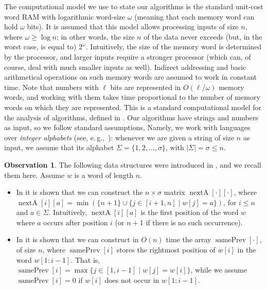 \documentclass[10pt,a4paper]{amsart}
\DeclareMathOperator{\prevArray}{samePrev}
\DeclareMathOperator{\nextpos}{nextA}
\theoremstyle{plain}
\theoremstyle{definition}
\newtheorem{observation}{Observation}
\begin{document}
The computational model we use to state our algorithms is the standard unit-cost word RAM with logarithmic word-size $\omega$ (meaning that each memory word can hold $\omega$ bits). It is assumed that this model allows processing inputs of size $n$, where $\omega \geq \log n$; in other words, the size $n$ of the data never exceeds (but, in the worst case, is equal to) $2^\omega$. Intuitively, the size of the memory word is determined by the processor, and larger inputs require a stronger processor (which can, of course, deal with much smaller inputs as well). Indirect addressing and basic arithmetical operations on such memory words are assumed to work in constant time. Note that numbers with $\ell$ bits are represented in $O(\ell/\omega )$ memory words, and working with them takes time proportional to the number of memory words on which they are represented. This is a standard computational model for the analysis of algorithms, defined in \cite{FredmanW90}. Our algorithms have strings and numbers as input, so we follow standard assumptions, Namely, we work with languages over {\em integer alphabets} (see, e.\,g.,~\cite{crochemore}): whenever we are given a string of size $n$ as input, we assume that its alphabet $\Sigma=\{1,2,\ldots,\sigma\}$, with $|\Sigma|=\sigma\leq n$.

\begin{observation}\label{preprocessing}
The following data structures were introduced in \cite{DBLP:journals/fuin/KoscheKMS22,KoscheKMP22}, and we recall them here. Assume $w$ is a word of length $n$. 
\begin{itemize}
\item In \cite{KoscheKMP22} it is shown that we can construct the $n\times \sigma$ matrix $\nextpos[\cdot][\cdot]$, where $\nextpos[i][a] = \min (\{n+1\}\cup \{j \in [i + 1, n] \mid w[j]=a\}) $, for $i\leq n$ and $a\in \Sigma$. Intuitively, $\nextpos[i][a]$ is the first position of the word $w$ where $a$ occurs after position $i$ (or $n+1$ if there is no such occurrence).  
\item In \cite{DBLP:journals/fuin/KoscheKMS22} it is shown that we can construct in $O(n)$ time the array $\prevArray[\cdot]$, of size $n$, where $\prevArray[i]$ stores the rightmost position of $w[i]$ in the word $w[1:i-1]$.
That is, $\prevArray[i] = \max \lbrace j \in [1, i -1] \mid w[j] = w[i]\rbrace$, while we assume $\prevArray[i] = 0$ if $w[i] $ does not occur in $w[1:i-1]$. 
\end{itemize}
\end{observation} 
\end{document}
